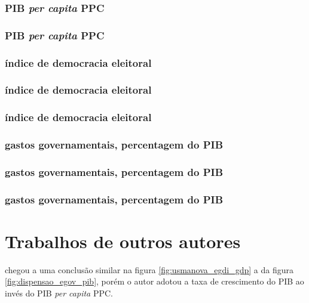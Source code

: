 \subsubsection{PIB \textit{per capita} PPC}

\subsubsection{PIB \textit{per capita} PPC}

\subsubsection{índice de democracia eleitoral}

\subsubsection{índice de democracia eleitoral}

\subsubsection{índice de democracia eleitoral}

\subsubsection{gastos governamentais, percentagem do PIB}

\subsubsection{gastos governamentais, percentagem do PIB}

\subsubsection{gastos governamentais, percentagem do PIB}

\section{Trabalhos de outros autores}

\cite{alisherovna2021whether} chegou a uma conclusão similar na figura \ref{fig:usmanova_egdi_gdp} a da figura \ref{fig:dispensao_egov_pib}, porém o autor adotou a taxa de crescimento do PIB ao invés do PIB \textit{per capita} PPC.

